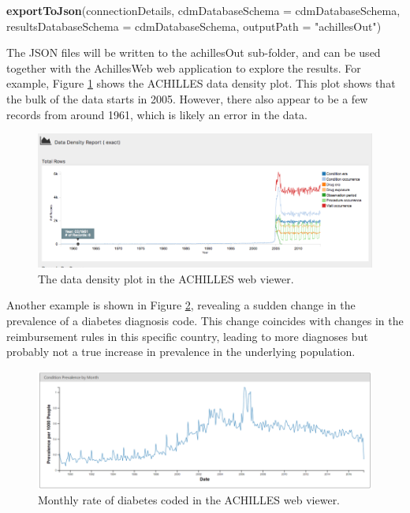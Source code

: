 \documentclass[11pt]{book}
\newenvironment{Shaded}{\begin{snugshade}}{\end{snugshade}}
\newcommand{\DataTypeTok}[1]{\textcolor[rgb]{0.13,0.29,0.53}{#1}}
\newcommand{\KeywordTok}[1]{\textcolor[rgb]{0.13,0.29,0.53}{\textbf{#1}}}
\newcommand{\NormalTok}[1]{#1}
\newcommand{\StringTok}[1]{\textcolor[rgb]{0.31,0.60,0.02}{#1}}
\theoremstyle{definition}
\theoremstyle{definition}
\theoremstyle{definition}
\theoremstyle{remark}
\begin{document}
\begin{Shaded}
\begin{Highlighting}[]
\KeywordTok{exportToJson}\NormalTok{(connectionDetails,}
             \DataTypeTok{cdmDatabaseSchema =}\NormalTok{ cdmDatabaseSchema,}
             \DataTypeTok{resultsDatabaseSchema =}\NormalTok{ cdmDatabaseSchema,}
             \DataTypeTok{outputPath =} \StringTok{"achillesOut"}\NormalTok{)}
\end{Highlighting}
\end{Shaded}

The JSON files will be written to the achillesOut sub-folder, and can be used together with the AchillesWeb web application to explore the results. For example, Figure \ref{fig:achillesDataDensity} shows the ACHILLES data density plot. This plot shows that the bulk of the data starts in 2005. However, there also appear to be a few records from around 1961, which is likely an error in the data.

\begin{figure}

{\centering \includegraphics[width=1\linewidth]{images/DataQuality/achillesDataDensity} 

}

\caption{The data density plot in the ACHILLES web viewer.}\label{fig:achillesDataDensity}
\end{figure}

Another example is shown in Figure \ref{fig:achillesCodeChange}, revealing a sudden change in the prevalence of a diabetes diagnosis code. This change coincides with changes in the reimbursement rules in this specific country, leading to more diagnoses but probably not a true increase in prevalence in the underlying population.

\begin{figure}

{\centering \includegraphics[width=1\linewidth]{images/DataQuality/achillesCodeChange} 

}

\caption{Monthly rate of diabetes coded in the ACHILLES web viewer.}\label{fig:achillesCodeChange}
\end{figure}
\end{document}
